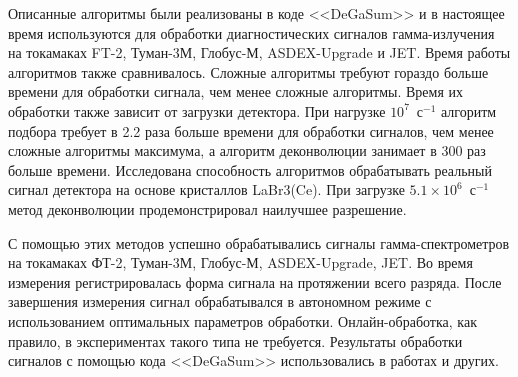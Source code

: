 Описанные алгоритмы были реализованы в коде <<DeGaSum>> и в настоящее время используются для обработки диагностических сигналов гамма-излучения на токамаках FT-2, Туман-3М, Глобус-М, ASDEX-Upgrade и JET. Время работы алгоритмов также сравнивалось. Сложные алгоритмы требуют гораздо больше времени для обработки сигнала, чем менее сложные алгоритмы. Время их обработки также зависит от загрузки детектора. При нагрузке $10^7$~с${}^{-1}$ алгоритм подбора требует в 2.2 раза больше времени для обработки сигналов, чем менее сложные алгоритмы максимума, а алгоритм деконволюции занимает в 300 раз больше времени. Исследована способность алгоритмов обрабатывать реальный сигнал детектора на основе кристаллов LaBr3(Ce). При загрузке $5.1 \times 10^6$~с${}^{-1}$ метод деконволюции продемонстрировал наилучшее разрешение.~\cite{Khilkevitch2020}

С помощью этих методов успешно обрабатывались сигналы гамма-спектрометров на токамаках ФТ-2, Туман-3М, Глобус-М, ASDEX-Upgrade, JET. Во время измерения регистрировалась форма сигнала на протяжении всего разряда. После завершения измерения сигнал обрабатывался в автономном режиме с использованием оптимальных параметров обработки. Онлайн-обработка, как правило, в экспериментах такого типа не требуется. Результаты обработки сигналов с помощью кода <<DeGaSum>> использовались в работах \cite{Shevelev2016,Shevelev2017,Shevelev2018,Chugunov2011,Shevelev2013} и других.

\FloatBarrier
